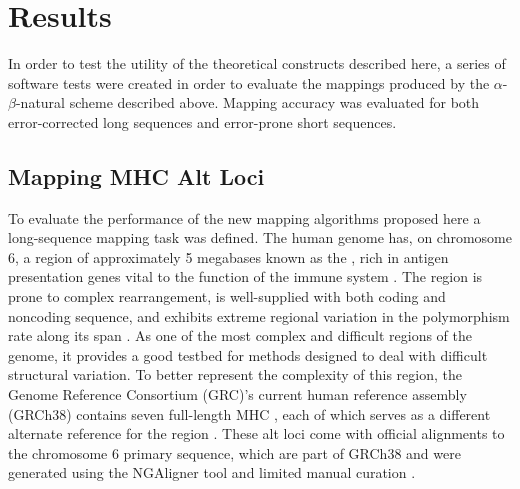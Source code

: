 
\section{Results}
\label{sec:results}


In order to test the utility of the theoretical constructs described here, a series of software tests were created in order to evaluate the mappings produced by the $\alpha$-$\beta$-natural scheme described above. Mapping accuracy was evaluated for both error-corrected long sequences and error-prone short sequences.

\subsection{Mapping MHC Alt Loci}

To evaluate the performance of the new mapping algorithms proposed here a long-sequence mapping task was defined. The human genome has, on chromosome 6, a region of approximately 5 megabases known as the , rich in antigen presentation genes vital to the function of the immune system \citep{the1999complete}.
The region is prone to complex rearrangement, is well-supplied with both coding and noncoding sequence, and exhibits extreme regional variation in the polymorphism rate along its span \citep{the1999complete}. As one of the most complex and difficult regions of the genome, it provides a good testbed for methods designed to deal with difficult structural variation. To better represent the complexity of this region, the Genome Reference Consortium (GRC)'s current human reference assembly (GRCh38) contains seven full-length MHC , each of which serves as a different alternate reference for the region \citep{church2011modernizing}. These alt loci come with official alignments to the chromosome 6 primary sequence, which are part of GRCh38 and were generated using the NGAligner tool and limited manual curation \citep{schneider2013genome,schneider2015grc}.

